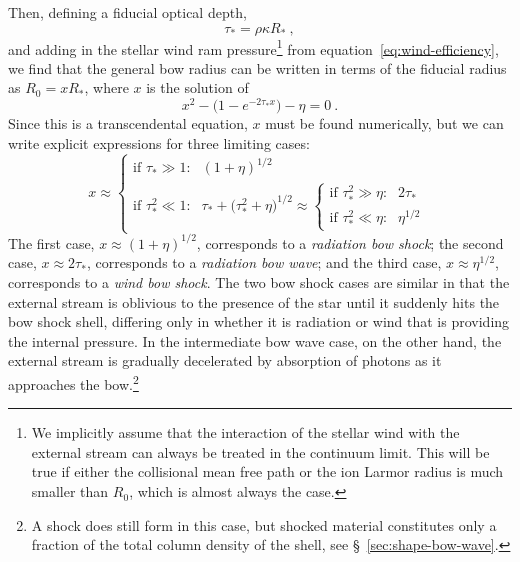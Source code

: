 Then, defining a fiducial optical depth,
\begin{equation}
  \label{eq:tau-star}
  \tau_* = \rho \kappa R_* \ ,
\end{equation}
and adding in the stellar wind ram pressure\footnote{%
  We implicitly assume that the interaction of the stellar wind with
  the external stream can always be treated in the continuum limit.
  This will be true if either the collisional mean free path or the
  ion Larmor radius is much smaller than \(R_0\), which is almost
  always the case.} %
from equation~\eqref{eq:wind-efficiency}, we find that the general bow
radius can be written in terms of the fiducial radius as
\(R_0 = x R_*\), where \(x\) is the solution of
\begin{equation}
  \label{eq:rad-full-x}
  x^2 - \bigl(1 - e^{-2 \tau_* x} \bigr) - \eta = 0 \ .
\end{equation}
Since this is a transcendental equation, \(x\) must be found
numerically, but we can write explicit expressions for three limiting
cases:
\begin{equation}
  \label{eq:x-cases}
  x \approx
  \begin{cases}
    \text{if \(\tau_* \gg 1\):} & (1 + \eta)^{1/2}  \\
    \text{if \(\tau_*^2 \ll 1\):} & \tau_* + \bigl( \tau_*^2 + \eta \bigr)^{1/2} \approx
    \begin{cases}
      \text{if \(\tau_*^2 \gg \eta\):} & 2 \tau_*  \\
      \text{if \(\tau_*^2 \ll \eta\):} & \eta^{1/2} 
    \end{cases}
  \end{cases}
\end{equation}
The first case, \(x \approx (1 + \eta)^{1/2}\), corresponds to a
\textit{radiation bow shock}; the second case,
\(x \approx 2 \tau_* \), corresponds to a \textit{radiation bow wave}; and the
third case, \(x \approx \eta^{1/2}\), corresponds to a \textit{wind bow shock}.
The two bow shock cases are similar in that the external stream is
oblivious to the presence of the star until it suddenly hits the bow
shock shell, differing only in whether it is radiation or wind that is
providing the internal pressure.  In the intermediate bow wave case,
on the other hand, the external stream is gradually decelerated by
absorption of photons as it approaches the bow.\footnote{A shock does
  still form in this case, but shocked material constitutes only a
  fraction of the total column density of the shell, see
  \S~\ref{sec:shape-bow-wave}.}

